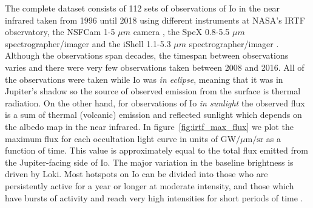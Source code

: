 \documentclass[modern]{aastex62}
\begin{document}
The complete dataset consists of 112 sets of observations of Io in the near infrared taken from 1996 until 2018 using different instruments at NASA's IRTF observatory, the NSFCam  1-5 $\mu m$ camera \citep{shure1994}, the SpeX 0.8-5.5 $\mu m$ spectrographer/imager \citep{rayner2003} and the iShell 1.1-5.3 $\mu m$  spectrographer/imager \citep{johnrayner2016}.
Although the observations span decades, the timespan between observations varies and there were very few observations taken between 2008 and 2016.
All of the observations were taken while Io was \emph{in eclipse}, meaning that it was in Jupiter's shadow so the source of observed emission from the surface is thermal radiation.
On the other hand, for observations of Io \emph{in sunlight} the observed flux is a sum of thermal (volcanic) emission and reflected sunlight which depends on the albedo map in the near infrared.
In figure~\ref{fig:irtf_max_flux} we plot the maximum flux for each occultation light curve in units of $\mathrm{GW}/\mu \mathrm{m}/\mathrm{sr}$ as a function of time.
This value is approximately equal to the total flux emitted from the Jupiter-facing side of Io.
The major variation in the baseline brightness is driven by Loki.
Most hotspots on Io can be divided into those who are persistently active for a year or longer at moderate intensity, and those which have bursts of activity and reach very high intensities for short periods of time \citep{dekleer2016}.
\end{document}
